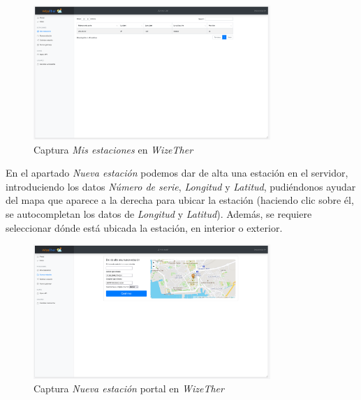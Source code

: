 \documentclass[12pt]{article}
\begin{document}
\begin{figure}[h]
	\begin{center}
		\includegraphics[width=0.8\textwidth]{img_rani/mis_estaciones.png}
		\caption{Captura \textit{Mis estaciones} en \textit{WizeTher}}
	\end{center}
\end{figure}

\pagebreak

\noindent En el apartado \textit{Nueva estación} podemos dar de alta una estación en el servidor, introduciendo los datos \textit{Número de serie}, \textit{Longitud} y \textit{Latitud}, pudiéndonos ayudar del mapa que aparece a la derecha para ubicar la estación  (haciendo clic sobre él, se autocompletan los datos de \textit{Longitud} y \textit{Latitud}). Además, se requiere seleccionar dónde está ubicada la estación, en interior o exterior.

\begin{figure}[h]
	\begin{center}
		\includegraphics[width=0.8\textwidth]{img_rani/nueva_estacion.png}
		\caption{Captura \textit{Nueva estación} portal en \textit{WizeTher}}
	\end{center}
\end{figure}

\pagebreak

\noindent
\end{document}
